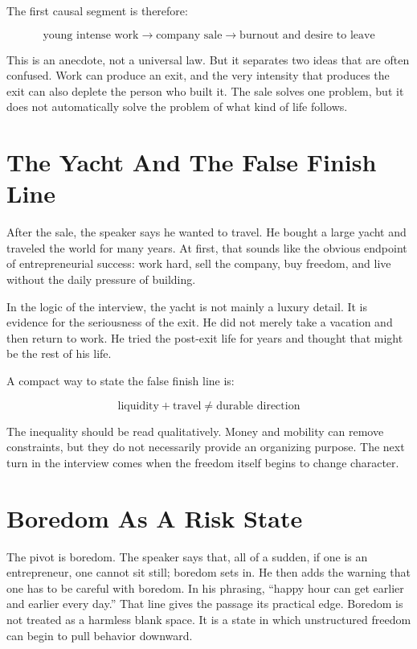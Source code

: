 The first causal segment is therefore:

\begin{equation}
\text{young intense work}
\longrightarrow
\text{company sale}
\longrightarrow
\text{burnout and desire to leave}
\end{equation}

This is an anecdote, not a universal law. But it separates two ideas that are often confused. Work can produce an exit, and the very intensity that produces the exit can also deplete the person who built it. The sale solves one problem, but it does not automatically solve the problem of what kind of life follows.

\section{The Yacht And The False Finish Line}

After the sale, the speaker says he wanted to travel. He bought a large yacht and traveled the world for many years. At first, that sounds like the obvious endpoint of entrepreneurial success: work hard, sell the company, buy freedom, and live without the daily pressure of building.

In the logic of the interview, the yacht is not mainly a luxury detail. It is evidence for the seriousness of the exit. He did not merely take a vacation and then return to work. He tried the post-exit life for years and thought that might be the rest of his life.

A compact way to state the false finish line is:

\begin{equation}
\text{liquidity} + \text{travel} \neq \text{durable direction}
\end{equation}

The inequality should be read qualitatively. Money and mobility can remove constraints, but they do not necessarily provide an organizing purpose. The next turn in the interview comes when the freedom itself begins to change character.

\section{Boredom As A Risk State}

The pivot is boredom. The speaker says that, all of a sudden, if one is an entrepreneur, one cannot sit still; boredom sets in. He then adds the warning that one has to be careful with boredom. In his phrasing, ``happy hour can get earlier and earlier every day.'' That line gives the passage its practical edge. Boredom is not treated as a harmless blank space. It is a state in which unstructured freedom can begin to pull behavior downward.

